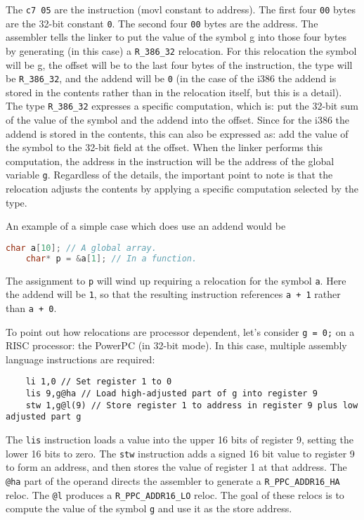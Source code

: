 The \texttt{c7 05} are the instruction (movl constant to address). The first
four \texttt{00} bytes are the 32-bit constant \texttt{0}. The second four
\texttt{00} bytes are the address. The assembler tells the linker to put the
value of the symbol g into those four bytes by generating (in this case) a
\texttt{R\_386\_32} relocation. For this relocation the symbol will be g,
the offset will be to the last four bytes of the instruction, the type will
be \texttt{R\_386\_32}, and the addend will be \texttt{0} (in the case of
the i386 the addend is stored in the contents rather than in the relocation
itself, but this is a detail). The type \texttt{R\_386\_32} expresses a
specific computation, which is: put the 32-bit sum of the value of the symbol
and the addend into the offset. Since for the i386 the addend is stored in
the contents, this can also be expressed as: add the value of the symbol to
the 32-bit field at the offset. When the linker performs this computation,
the address in the instruction will be the address of the global variable
\texttt{g}. Regardless of the details, the important point to note is that the
relocation adjusts the contents by applying a specific computation selected by
the type.

An example of a simple case which does use an addend would be

\begin{lstlisting}[language=C]
    char a[10]; // A global array.
    char* p = &a[1]; // In a function.
\end{lstlisting}

The assignment to \texttt{p} will wind up requiring a relocation for the
symbol \texttt{a}. Here the addend will be \texttt{1}, so that the resulting
instruction references \texttt{a + 1} rather than \texttt{a + 0}.

To point out how relocations are processor dependent, let's consider \texttt{g
= 0;} on a RISC processor: the PowerPC (in 32-bit mode). In this case, multiple
assembly language instructions are required:

\begin{lstlisting}
    li 1,0 // Set register 1 to 0
    lis 9,g@ha // Load high-adjusted part of g into register 9
    stw 1,g@l(9) // Store register 1 to address in register 9 plus low adjusted part g
\end{lstlisting}

The \texttt{lis} instruction loads a value into the upper 16 bits of register
9, setting the lower 16 bits to zero. The \texttt{stw} instruction adds a
signed 16 bit value to register 9 to form an address, and then stores the value
of register 1 at that address. The \texttt{@ha} part of the operand directs
the assembler to generate a \texttt{R\_PPC\_ADDR16\_HA} reloc. The \texttt{@l}
produces a \texttt{R\_PPC\_ADDR16\_LO} reloc. The goal of these relocs is to
compute the value of the symbol \texttt{g} and use it as the store address.

